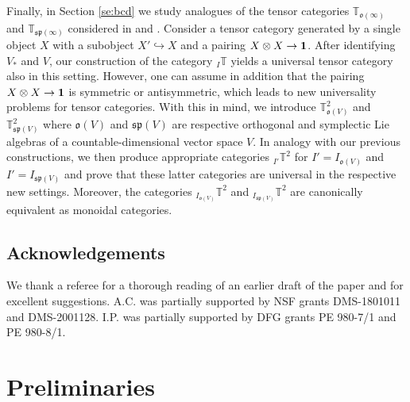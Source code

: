 \documentclass[11pt]{article}
\theoremstyle{plain}
\theoremstyle{nonumberplain}
\theoremstyle{plain}
\numberwithin{equation}{section}
\theoremstyle{nonumberplain}
\newcommand\bT{{\mathbb T}}
\newcommand\fo{{\mathfrak o}}
\newcommand\fp{{\mathfrak p}}
\newcommand\fs{{\mathfrak s}}
\newcommand\1{{\bf 1}}
\begin{document}
 Finally, in Section \ref{se:bcd} we study analogues of the tensor categories $\bT_{\fo(\infty)}$ and $\bT_{\fs\fp(\infty)}$ considered in \cite{DPS} and \cite{SS}. Consider a tensor category generated by a single object $X$ with a subobject $X'\hookrightarrow X$ and a pairing $X\otimes X\rightarrow \text{\textbf{1}}$. After identifying $V_*$ and $V$, our construction of the category ${}_I\bT$ yields a universal tensor category also in this setting. However, one can assume in addition that the pairing 
$X\otimes X\rightarrow \text{\textbf{1}}$ is symmetric or antisymmetric, which leads to new universality problems for tensor categories. %
 With this in mind, we introduce %
  $\bT^2_{\fo(V)}$ and $\bT^2_{\fs\fp(V)}$ where $\fo(V)$ and $\fs\fp(V)$ are respective orthogonal and symplectic Lie algebras of a countable-dimensional vector space $V$. In analogy with our previous constructions, we then produce appropriate categories $_{I'} \bT^2$ for $I'=I_{\fo(V)}$ and $I'=I_{\fs\fp(V)}$ and prove that these latter categories are universal in the respective new settings. Moreover, the categories ${}_{I_{\fo(V)}}\bT^2$ and ${}_{I_{\fs\fp(V)}}\bT^2$ are canonically equivalent as monoidal categories.


\subsection*{Acknowledgements}

We thank a referee for a thorough reading of an earlier draft of the paper and for excellent suggestions. A.C. was partially supported by NSF grants DMS-1801011 and DMS-2001128. I.P. was partially supported by DFG grants PE 980-7/1 and PE 980-8/1. 


\section{Preliminaries}\label{se.prel}
\end{document}
